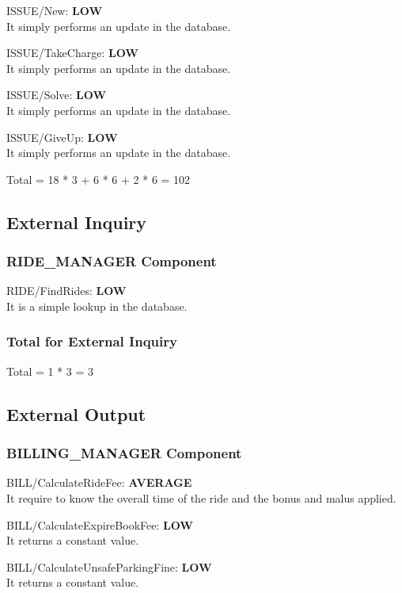 \documentclass[11pt]{article} %
\newcommand{\extInput}[3]{ #1:  \textbf{#2} \\ #3  }
\begin{document}
\begin{description}
	\item \extInput
		{ISSUE/New}
		{LOW}
		{It simply performs an update in the database.}
	\item \extInput
		{ISSUE/TakeCharge}
		{LOW}
		{It simply performs an update in the database.}
	\item \extInput
		{ISSUE/Solve}
		{LOW}
		{It simply performs an update in the database.}
	\item \extInput
		{ISSUE/GiveUp}
		{LOW}
		{It simply performs an update in the database.}
\end{description}

Total = 18 * 3 + 6 * 6 + 2 * 6 =  102

\subsection{External Inquiry}

\subsubsection{RIDE\_MANAGER Component}
\begin{description}
	\item \extInput
		{RIDE/FindRides}
		{LOW}
		{It is a simple lookup in the database.}
\end{description}

\subsubsection{Total for External Inquiry}
Total = 1 * 3 = 3

\subsection{External Output}

\subsubsection{BILLING\_MANAGER Component}
\begin{description}
	\item \extInput
		{BILL/CalculateRideFee}
		{AVERAGE}
		{It require to know the overall time of the ride and the bonus and malus applied.}
	\item \extInput
		{BILL/CalculateExpireBookFee}
		{LOW}
		{It returns a constant value.}
	\item \extInput
		{BILL/CalculateUnsafeParkingFine}
		{LOW}
		{It returns a constant value.}
\end{description}
\end{document}
